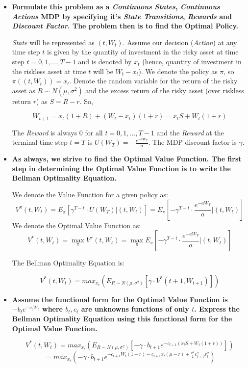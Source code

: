 \documentclass[12pt]{amsart}
\begin{document}
\begin{itemize}
\item {\bf Formulate this problem as a {\em Continuous States}, {\em Continuous Actions} MDP by specifying it's {\em State Transitions}, {\em Rewards} and {\em Discount Factor}. The problem then is to find the Optimal Policy.}

{\em State} will be represented as $(t, W_t)$. Assume our decision ({\em Action}) at any time step $t$ is given by the quantity of investment in the risky asset at time step $t = 0, 1, \ldots, T -1$ and is denoted by $x_t$ (hence, quantity of investment in the riskless asset at time $t$ will be $W_t - x_t$). We denote the policy as $\pi$, so $\pi((t, W_t)) = x_t$. Denote the random variable for the return of the risky asset as $R \sim N(\mu, \sigma^2)$ and the excess return of the risky asset (over riskless return $r$) as $S = R - r$. So,

$$W_{t+1} = x_t (1 + R) + (W_t - x_t) (1 + r) = x_t S + W_t (1 + r)$$

The {\em Reward} is always 0 for all $t = 0, 1, \ldots, T-1$ and the {\em Reward} at the terminal time step $t=T$ is $U(W_T) = - \frac {e^{-a W_T}} {a}$. The MDP discount factor is $\gamma$.

\item {\bf As always, we strive to find the Optimal Value Function. The first step in determining the Optimal Value Function is to write the Bellman Optimality Equation.}

We denote the Value Function for a given policy as:
$$V^{\pi}(t, W_t) = E_{\pi}[\gamma^{T-t} \cdot U(W_T) | (t, W_t)] = E_{\pi}[- \gamma^{T-t} \cdot \frac {e^{-a W_T}} a | (t, W_t)]$$
We denote the Optimal Value Function as:
$$V^*(t, W_t) = \max_{\pi} V^{\pi}(t, W_t) = \max_{\pi} E_{\pi}[-\gamma^{T-t} \cdot \frac {e^{-a W_T}} a | (t, W_t)]$$

The Bellman Optimality Equation is:

$$V^*(t, W_t) = max_{x_t} (E_{R \sim N(\mu, \sigma^2)}[\gamma \cdot V^*(t+1, W_{t+1})])$$

\item {\bf Assume the functional form for the Optimal Value Function is $-b_t e^{-c_t W_t}$ where $b_t, c_t$ are unknowns functions of only $t$. Express the Bellman Optimality Equation using this functional form for the Optimal Value Function.}

$$V^*(t, W_t) = max_{x_t} (E_{R \sim N(\mu, \sigma^2)} [- \gamma \cdot b_{t+1} e^{-c_{t+1} (x_t S + W_t(1+r))}])$$
$$ = max_{x_t} (- \gamma \cdot b_{t+1} e^{-c_{t+1}W_t(1+r) - c_{t+1} x_t (\mu - r) + \frac {\sigma^2} {2} c^2_{t+1} x_t^2})$$


\end{itemize}
\end{document}

